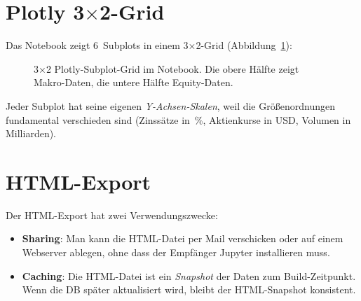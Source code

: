 \section{Plotly 3$\times$2-Grid}

Das Notebook zeigt 6~Subplots in einem 3$\times$2-Grid
(Abbildung~\ref{fig:notebook-grid}):

\begin{figure}[ht]
\centering
{}
\caption{3$\times$2 Plotly-Subplot-Grid im Notebook. Die obere
  Hälfte zeigt Makro-Daten, die untere Hälfte Equity-Daten.}
\label{fig:notebook-grid}
\end{figure}

Jeder Subplot hat seine eigenen \emph{Y-Achsen-Skalen}, weil die
Größenordnungen fundamental verschieden sind (Zinssätze in
\,\%, Aktienkurse in USD, Volumen in Milliarden).

\section{HTML-Export}

Der HTML-Export hat zwei Verwendungszwecke:

\begin{itemize}
  \item \textbf{Sharing}: Man kann die HTML-Datei per Mail
        verschicken oder auf einem Webserver ablegen, ohne dass
        der Empfänger Jupyter installieren muss.
  \item \textbf{Caching}: Die HTML-Datei ist ein \emph{Snapshot}
        der Daten zum Build-Zeitpunkt. Wenn die DB später
        aktualisiert wird, bleibt der HTML-Snapshot konsistent.
\end{itemize}

